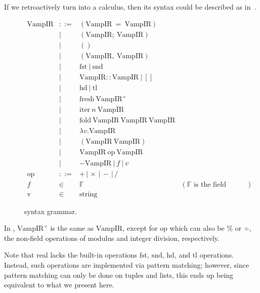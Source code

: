 \documentclass[
    9pt,            
    techreport,       
    affiltop,       
]{art}
\begin{document}
If we retroactively turn \VampIR{} into a calculus, then
its syntax could be described as in~.

\begin{figure}[!htb]
\begin{equation*}
\begin{array}{rclr}
    \text{VampIR} &::= &(\text{VampIR} \ = \ \text{VampIR}) &\\
    &| &(\text{VampIR};\ \text{VampIR}) &\\
    &| &() &\\
    &| &(\text{VampIR},\ \text{VampIR}) &\\
    &| &\text{fst}\ |\ \text{snd} &\\
    &| &\text{VampIR}:: \text{VampIR}\ |\ [] &\\
    &| &\text{hd}\ |\ \text{tl} &\\
    &| &\text{fresh}\ \text{VampIR}^+ &\\
    &| &\text{iter}\ n\ \text{VampIR} &\\
    &| &\text{fold}\ \text{VampIR}\ \text{VampIR}\ \text{VampIR} &\\
    &| &\lambda v . \text{VampIR} &\\
    &| &(\text{VampIR}\ \text{VampIR}) &\\
    &| &\text{VampIR} \ \text{op} \ \text{VampIR} &\\
    &| &- \text{VampIR}\ |\ f\ |\ v &\\[2mm]
    \text{op} &::= &+ \,|\, \times \,|\, - \,|\, / &\\
    f &\in &\mathbb{F} &(\text{$\mathbb{F}$ is the field associated with the circuit.})\\
    \text{v} &\in &\text{string}
\end{array}
\end{equation*}
\caption{\VampIR{} syntax grammar.}
\label{fig:grammar}
\end{figure}

\begin{remark}
In , $\text{VampIR}^+$ is the same as $\text{VampIR}$, except for $\text{op}$ which can also be $\%$ or $\div$, the non-field operations of modulus and integer division, respectively.
\end{remark}

\begin{remark}
Note that real \VampIR{} lacks the built-in operations $\text{fst}$, $\text{snd}$, $\text{hd}$, and $\text{tl}$ operations. 
Instead, such operations are implemented via pattern matching; however, since pattern matching can only be done on tuples and lists, this ends up being equivalent to what we present here.
\end{remark}
\end{document}

